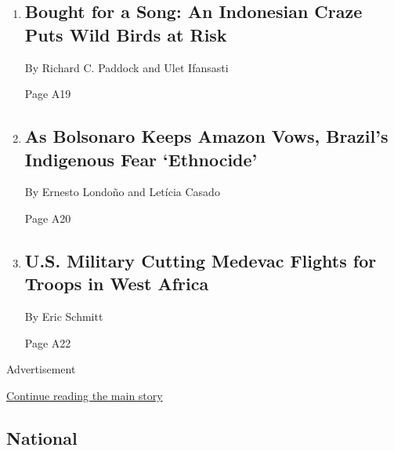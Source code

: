 \begin{enumerate}
\def\labelenumi{\arabic{enumi}.}
\item
  \href{/2020/04/18/world/asia/indonesia-songbirds-competition.html}{}

  \hypertarget{bought-for-a-song-an-indonesian-craze-puts-wild-birds-at-risk-1}{%
  \subsection{Bought for a Song: An Indonesian Craze Puts Wild Birds at
  Risk}\label{bought-for-a-song-an-indonesian-craze-puts-wild-birds-at-risk-1}}

  By Richard C. Paddock and Ulet Ifansasti

  Page A19
\item
  \href{/2020/04/19/world/americas/bolsonaro-brazil-amazon-indigenous.html}{}

  \hypertarget{as-bolsonaro-keeps-amazon-vows-brazils-indigenous-fear-ethnocide-1}{%
  \subsection{As Bolsonaro Keeps Amazon Vows, Brazil's Indigenous Fear
  `Ethnocide'}\label{as-bolsonaro-keeps-amazon-vows-brazils-indigenous-fear-ethnocide-1}}

  By Ernesto Londoño and Letícia Casado

  Page A20
\item
  \href{/2020/04/18/world/africa/west-africa-special-operations-medevac.html}{}

  \hypertarget{us-military-cutting-medevac-flights-for-troops-in-west-africa}{%
  \subsection{U.S. Military Cutting Medevac Flights for Troops in West
  Africa}\label{us-military-cutting-medevac-flights-for-troops-in-west-africa}}

  By Eric Schmitt

  Page A22
\end{enumerate}

Advertisement

\protect\hyperlink{after-mid2}{Continue reading the main story}

\hypertarget{national}{%
\subsection{National}\label{national}}

